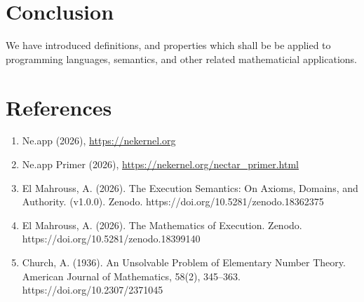 \documentclass[11pt, a4paper]{article}
\begin{document}
\section{Conclusion}

We have introduced definitions, and properties which shall be be applied to programming languages, semantics, and other related mathematicial applications.

\section{References}

\begin{enumerate}
  	\item Ne.app (2026), \href{https://nekernel.org/nekernel}{https://nekernel.org}
  	\item Ne.app Primer (2026), \href{https://nekernel.org/nectar\_primer.html}{https://nekernel.org/nectar\_primer.html}
  	\item El Mahrouss, A. (2026). The Execution Semantics: On Axioms, Domains, and Authority. (v1.0.0). Zenodo. https://doi.org/10.5281/zenodo.18362375
	\item El Mahrouss, A. (2026). The Mathematics of Execution. Zenodo. \\https://doi.org/10.5281/zenodo.18399140
	\item Church, A. (1936). An Unsolvable Problem of Elementary Number Theory. American Journal of Mathematics, 58(2), 345–363. https://doi.org/10.2307/2371045
\end{enumerate}
\end{document}
